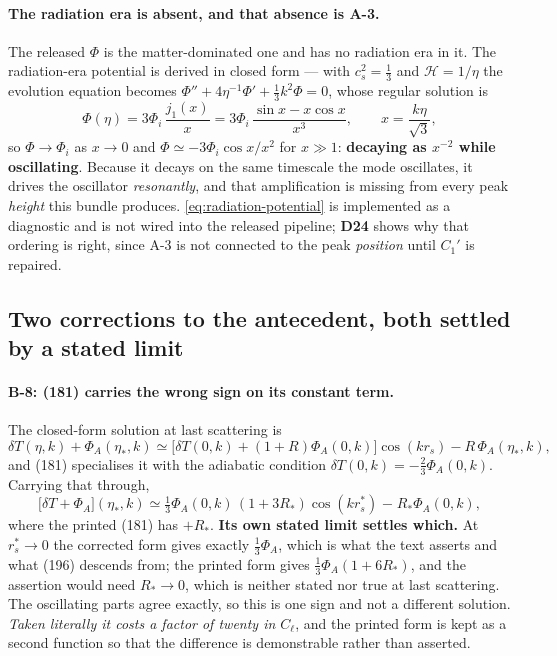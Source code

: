 \paragraph{The radiation era is absent, and that absence is A-3.} The released
$\Phi$ is the matter-dominated one and has no radiation era in it. The
radiation-era potential is derived in closed form --- with $c_s^2=\tfrac13$ and
$\mathcal H=1/\eta$ the evolution equation becomes
$\Phi''+4\eta^{-1}\Phi'+\tfrac13k^2\Phi=0$, whose regular solution is
\begin{equation}
  \Phi(\eta)=3\Phi_i\,\frac{j_1(x)}{x}
            =3\Phi_i\,\frac{\sin x-x\cos x}{x^3},
  \qquad x=\frac{k\eta}{\sqrt3},
  \label{eq:radiation-potential}
\end{equation}
so $\Phi\to\Phi_i$ as $x\to0$ and $\Phi\simeq-3\Phi_i\cos x/x^2$ for $x\gg1$:
\textbf{decaying as $x^{-2}$ while oscillating}. Because it decays on the same
timescale the mode oscillates, it drives the oscillator \emph{resonantly}, and
that amplification is missing from every peak \emph{height} this bundle
produces. \eqref{eq:radiation-potential} is implemented as a diagnostic and is
not wired into the released pipeline; \textbf{D24} shows why that ordering is
right, since A-3 is not connected to the peak \emph{position} until $C_1'$ is
repaired.

\subsection{Two corrections to the antecedent, both settled by a stated limit}

\paragraph{B-8: (181) carries the wrong sign on its constant term.} The
closed-form solution at last scattering is
\begin{equation}
  \delta T(\eta,k)+\Phi_A(\eta_*,k)
  \simeq\big[\delta T(0,k)+(1+R)\Phi_A(0,k)\big]\cos(kr_s)-R\,\Phi_A(\eta_*,k),
  \tag{180}\label{eq:180}
\end{equation}
and (181) specialises it with the adiabatic condition
$\delta T(0,k)=-\tfrac23\Phi_A(0,k)$. Carrying that through,
\begin{equation}
  \big[\delta T+\Phi_A\big](\eta_*,k)
  \simeq\tfrac13\Phi_A(0,k)\,(1+3R_*)\cos(kr_s^*)\;\boldsymbol{-}\;R_*\Phi_A(0,k),
  \label{eq:181-corrected}
\end{equation}
where the printed (181) has $+R_*$. \textbf{Its own stated limit settles
which.} At $r_s^*\to0$ the corrected form gives exactly $\tfrac13\Phi_A$, which
is what the text asserts and what (196) descends from; the printed form gives
$\tfrac13\Phi_A(1+6R_*)$, and the assertion would need $R_*\to0$, which is
neither stated nor true at last scattering. The oscillating parts agree
exactly, so this is one sign and not a different solution. \emph{Taken
literally it costs a factor of twenty in $C_\ell$}, and the printed form is kept
as a second function so that the difference is demonstrable rather than
asserted.


